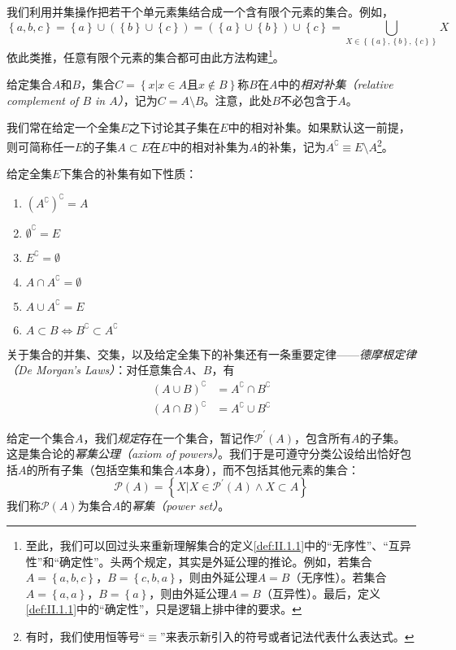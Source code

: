 \documentclass[../main.tex]{subfiles}
\begin{document}
我们利用并集操作把若干个单元素集结合成一个含有限个元素的集合。例如，
\[
    \left\{a,b,c\right\}=\left\{a\right\}\cup\left(\left\{b\right\}\cup\left\{c\right\}\right)=\left(\left\{a\right\}\cup\left\{b\right\}\right)\cup\left\{c\right\}=\bigcup_{X\in\left\{\left\{a\right\},\left\{b\right\},\left\{c\right\}\right\}}X
\]
依此类推，任意有限个元素的集合都可由此方法构建\footnote{至此，我们可以回过头来重新理解集合的定义\ref{def:II.1.1}中的“无序性”、“互异性”和“确定性”。头两个规定，其实是外延公理的推论。例如，若集合$A=\left\{a,b,c\right\}$，$B=\left\{c,b,a\right\}$，则由外延公理$A=B$（无序性）。若集合$A=\left\{a,a\right\}$，$B=\left\{a\right\}$，则由外延公理$A=B$（互异性）。最后，定义\ref{def:II.1.1}中的“确定性”，只是逻辑上排中律的要求。}。

给定集合$A$和$B$，集合$C=\left\{x|x\in A\text{且}x\notin B\right\}$称$B$在$A$中的\emph{相对补集（relative complement of $B$ in $A$）}，记为$C=A\setminus B$。注意，此处$B$不必包含于$A$。

我们常在给定一个全集$E$之下讨论其子集在$E$中的相对补集。如果默认这一前提，则可简称任一$E$的子集$A\subset E$在$E$中的相对补集为$A$的补集，记为$A^\complement\equiv E\setminus A$\footnote{有时，我们使用恒等号“$\equiv$”来表示新引入的符号或者记法代表什么表达式。}。

给定全集$E$下集合的补集有如下性质：
\begin{enumerate}
    \item $\left(A^\complement\right)^\complement=A$
    \item $\emptyset^\complement=E$
    \item $E^\complement=\emptyset$
    \item $A\cap A^\complement=\emptyset$
    \item $A\cup A^\complement=E$
    \item $A\subset B\Leftrightarrow B^\complement\subset A^\complement$
\end{enumerate}

关于集合的并集、交集，以及给定全集下的补集还有一条重要定律——\emph{德摩根定律（De Morgan's Laws）}：对任意集合$A$、$B$，有
\begin{align*}
    \left(A\cup B\right)^\complement & =A^\complement\cap B^\complement \\
    \left(A\cap B\right)^\complement & =A^\complement\cup B^\complement
\end{align*}

给定一个集合$A$，我们\emph{规定}存在一个集合，暂记作$\mathcal{P}^\prime\left(A\right)$，包含所有$A$的子集。这是集合论的\emph{幂集公理（axiom of powers）}。我们于是可遵守分类公设给出恰好包括$A$的所有子集（包括空集和集合$A$本身），而不包括其他元素的集合：
\[
    \mathcal{P}\left(A\right)=\left\{X|X\in\mathcal{P}^\prime\left(A\right)\wedge X\subset A\right\}
\]
我们称$\mathcal{P}\left(A\right)$为集合$A$的\emph{幂集（power set）}。
\end{document}
